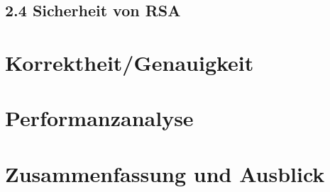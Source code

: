 \documentclass[course=asp]{aspdoc}
\begin{document}
\subsection*{2.4 Sicherheit von RSA}



\section{Korrektheit/Genauigkeit}


\section{Performanzanalyse}


\section{Zusammenfassung und Ausblick}


{}
\end{document}

